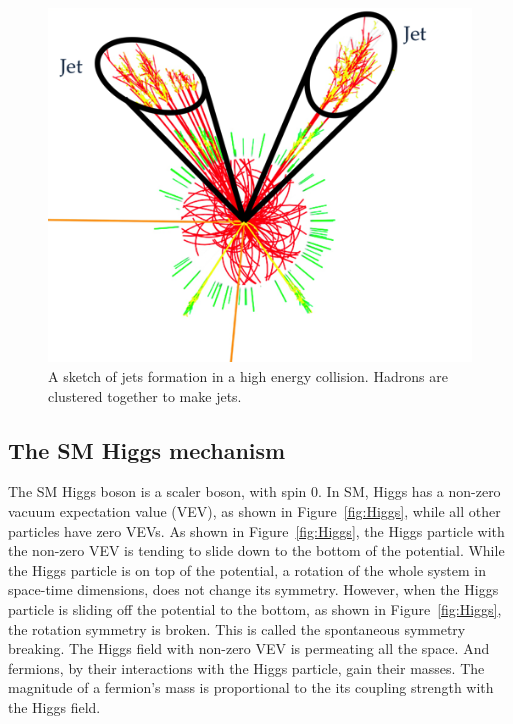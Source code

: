 \begin{figure}[!htbp]
\centering
\includegraphics[width=.7\textwidth]{figures/clustering.png}
\caption{A sketch of jets formation in a high energy collision. Hadrons are clustered
together to make jets.}
\label{fig:jet_formation}
\end{figure}  



\subsection{The SM Higgs mechanism}

The SM Higgs boson is a scaler boson, with spin 0. In SM, Higgs has a non-zero vacuum expectation
value (VEV), as shown in Figure~\ref{fig:Higgs}, while all other particles have zero VEVs. 
As shown in Figure~\ref{fig:Higgs}, the Higgs particle with the non-zero VEV is tending to slide down to the bottom of the potential. While the Higgs particle is on top of the potential, a rotation of the whole system in space-time dimensions, does not change its symmetry. However, when the Higgs particle is sliding off the potential to the bottom, as shown in Figure~\ref{fig:Higgs}, the rotation symmetry is broken. This is called the spontaneous symmetry breaking.  
The Higgs field with non-zero VEV is permeating all the space. And fermions, by their interactions with the Higgs particle, gain their masses. The magnitude of a fermion's mass is proportional to the its coupling strength with the Higgs field.

